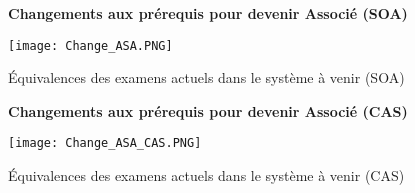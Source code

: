\begin{figure}[hp]
\begin{center}
\textbf{Changements aux prérequis pour devenir Associé (SOA)}\par\medskip
\end{center}
\hfill\texttt{[image: Change\_ASA.PNG]}\hspace*{\fill}
\caption{Équivalences des examens actuels dans le système à venir (SOA)}
\end{figure}
\par
\begin{figure}[hp]
\begin{center}
\textbf{Changements aux prérequis pour devenir Associé (CAS)}\par\medskip
\end{center}
\hfill\texttt{[image: Change\_ASA\_CAS.PNG]}\hspace*{\fill}
\caption{Équivalences des examens actuels dans le système à venir (CAS)}
\end{figure}
\par

\newpage